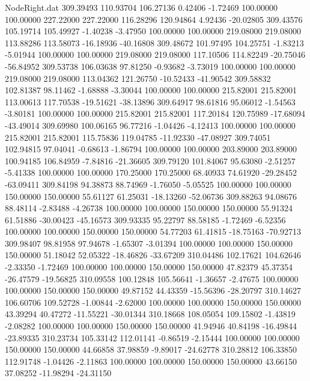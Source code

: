 \begin{filecontents}{NodeRight.dat}
 309.39493  110.93704  106.27136     0.42406   -1.72469  100.00000  100.00000  227.22000  227.22000  116.28296  120.94864    4.92436  -20.02805
 309.43576  105.19714  105.49927    -1.40238   -3.47950  100.00000  100.00000  219.08000  219.08000  113.88286  113.58073  -16.18936  -40.16808
 309.48672  101.97495  104.25751    -1.83213   -5.01944  100.00000  100.00000  219.08000  219.08000  117.10506  114.82249  -20.75046  -56.84952
 309.53738  106.03638   97.81250    -0.93682   -3.73019  100.00000  100.00000  219.08000  219.08000  113.04362  121.26750  -10.52433  -41.90542
 309.58832  102.81387   98.11462    -1.68888   -3.30044  100.00000  100.00000  215.82001  215.82001  113.00613  117.70538  -19.51621  -38.13896
 309.64917   98.61816   95.06012    -1.54563   -3.80181  100.00000  100.00000  215.82001  215.82001  117.20184  120.75989  -17.68094  -43.49014
 309.69980  100.06165   96.77216    -1.04426   -4.12413  100.00000  100.00000  215.82001  215.82001  115.75836  119.04785  -11.92330  -47.08927
 309.74051  102.94815   97.04041    -0.68613   -1.86794  100.00000  100.00000  203.89000  203.89000  100.94185  106.84959   -7.84816  -21.36605
 309.79120  101.84067   95.63080    -2.51257   -5.41338  100.00000  100.00000  170.25000  170.25000   68.40933   74.61920  -29.28452  -63.09411
 309.84198   94.38873   88.74969    -1.76050   -5.05525  100.00000  100.00000  150.00000  150.00000   55.61127   61.25031  -18.13260  -52.06736
 309.88263   94.08676   88.48114    -2.83488   -4.26738  100.00000  100.00000  150.00000  150.00000   55.91324   61.51886  -30.00423  -45.16573
 309.93335   95.22797   88.58185    -1.72469   -6.52356  100.00000  100.00000  150.00000  150.00000   54.77203   61.41815  -18.75163  -70.92713
 309.98407   98.81958   97.94678    -1.65307   -3.01394  100.00000  100.00000  150.00000  150.00000   51.18042   52.05322  -18.46826  -33.67209
 310.04486  102.17621  104.62646    -2.33350   -1.72469  100.00000  100.00000  150.00000  150.00000   47.82379   45.37354  -26.47579  -19.56825
 310.09558  100.12848  105.56641    -1.36657   -2.47675  100.00000  100.00000  150.00000  150.00000   49.87152   44.43359  -15.56396  -28.20797
 310.14627  106.60706  109.52728    -1.00844   -2.62000  100.00000  100.00000  150.00000  150.00000   43.39294   40.47272  -11.55221  -30.01344
 310.18668  108.05054  109.15802    -1.43819   -2.08282  100.00000  100.00000  150.00000  150.00000   41.94946   40.84198  -16.49844  -23.89335
 310.23734  105.33142  112.01141    -0.86519   -2.15444  100.00000  100.00000  150.00000  150.00000   44.66858   37.98859   -9.89017  -24.62778
 310.28812  106.33850  112.91748    -1.04426   -2.11863  100.00000  100.00000  150.00000  150.00000   43.66150   37.08252  -11.98294  -24.31150

\end{filecontents}
